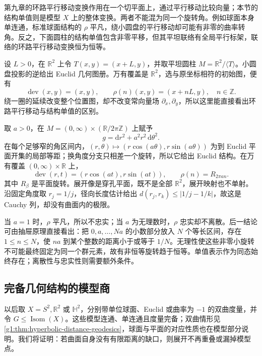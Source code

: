 \ProseParagraphBreak

第九章的环路平行移动变换作用在一个切平面上，通过平行移动比较向量；本节的结构单值则是模型 \(X\) 上的整体变换。两者不能混为同一个旋转角。例如球面本身单连通，标准球面结构的 \(\rho\) 平凡，绕小圆盘的平行移动却可能有非零的曲率转角。反之，下面圆柱的结构单值包含非零平移，但其平坦联络有全局平行标架，联络的环路平行移动变换恒为恒等。

\begin{example}
	\label{g1:exm:flat-cylinder-development}
	设 \(L>0\)，在 \(\mathbb R^2\) 上令 \(T(x,y)=(x+L,y)\)，并取平坦圆柱 \(M=\mathbb R^2/\langle T\rangle\)。小圆盘投影的逆给出 Euclid 几何图册。万有覆盖是 \(\mathbb R^2\)，选与原坐标相符的初始图，便有
	\[
		\operatorname{dev}(x,y)=(x,y),\qquad
		\rho(n)(x,y)=(x+nL,y),\quad n\in\mathbb Z.
	\]
	绕一圈的延续改变整个位置图，却不改变常向量场 \(\partial_x,\partial_y\)，所以这里能直接看出环路平行移动与结构单值的区别。
\end{example}

\begin{example}
	\label{g1:exm:incomplete-holonomy}
	取 \(a>0\)，在 \(M=(0,\infty)\times(\mathbb R/2\pi\mathbb Z)\) 上赋予
	\[
		g=\mathrm{d}r^2+a^2r^2\,\mathrm{d}\theta^2.
	\]
	在每个足够窄的角区间内，\((r,\theta)\mapsto(r\cos(a\theta),r\sin(a\theta))\) 为到 Euclid 平面开集的局部等距；换角度分支只相差一个旋转，所以它给出 Euclid 结构。在万有覆盖 \((0,\infty)\times\mathbb R\) 上，
	\[
		\operatorname{dev}(r,t)=(r\cos(at),r\sin(at)),\qquad
		\rho(n)=R_{2\pi an}.
	\]
	其中 \(R_\beta\) 是平面旋转。展开像是穿孔平面，既不是全部 \(\mathbb R^2\)，展开映射也不单射。沿固定角度取 \(r_j=1/j\)，径向长度估计给出 \(d(r_j,r_k)\le|1/j-1/k|\)，故这是 Cauchy 列，却没有曲面内的极限。

	当 \(a=1\) 时，\(\rho\) 平凡，所以不忠实；当 \(a\) 为无理数时，\(\rho\) 忠实却不离散。后一结论可由抽屉原理直接看出：把 \(0,a,\ldots,Na\) 的小数部分放入 \(N\) 个等长区间，存在 \(1\le n\le N\)，使 \(na\) 到某个整数的距离小于或等于 \(1/N\)。无理性使这些非零小旋转不可能最终固定为同一个群元素，故有非恒等旋转趋于恒等。单值表示作为同态始终存在；离散性与忠实性则需要额外条件。
\end{example}

\subsection{完备几何结构的模型商}
\label{g1:subsec:1003:04}

以后取 \(X=S^2,\mathbb R^2\) 或 \(\mathbb H^2\)，分别带单位球面、Euclid 或曲率为 \(-1\) 的双曲度量，并令 \(G\le\operatorname{Isom}(X)\)。这些模型连通、单连通且度量完备；双曲情形见\cref{g1:thm:hyperbolic-distance-geodesics}，球面与平面的对应性质也在模型部分说明。我们将证明：若曲面自身没有有限距离的缺口，则展开不再重叠或漏掉模型点。

